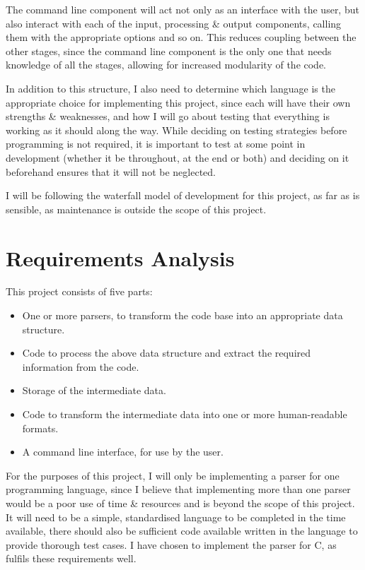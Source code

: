 The command line component will act not only as an interface with the user, but
also interact with each of the input, processing \& output components, calling
them with the appropriate options and so on. This reduces coupling between the
other stages, since the command line component is the only one that needs
knowledge of all the stages, allowing for increased modularity of the code.

In addition to this structure, I also need to determine which language is the
appropriate choice for implementing this project, since each will have their own
strengths \& weaknesses, and how I will go about testing that everything is
working as it should along the way. While deciding on testing strategies before
programming is not required, it is important to test at some point in
development (whether it be throughout, at the end or both) and deciding on it
beforehand ensures that it will not be neglected.

I will be following the waterfall model of development for this project, as far
as is sensible, as maintenance is outside the scope of this project.

\section{Requirements Analysis}
This project consists of five parts:
\begin{itemize}
  \item One or more parsers, to transform the code base into an appropriate data
    structure.
  \item Code to process the above data structure and extract the required
    information from the code.
  \item Storage of the intermediate data.
  \item Code to transform the intermediate data into one or more human-readable
    formats.
  \item A command line interface, for use by the user.
\end{itemize}

For the purposes of this project, I will only be implementing a parser for one
programming language, since I believe that implementing more than one parser
would be a poor use of time \& resources and is beyond the scope of this
project. It will need to be a simple, standardised language to be completed in
the time available, there should also be sufficient code available written in
the language to provide thorough test cases. I have chosen to implement the
parser for C, as fulfils these requirements well.

